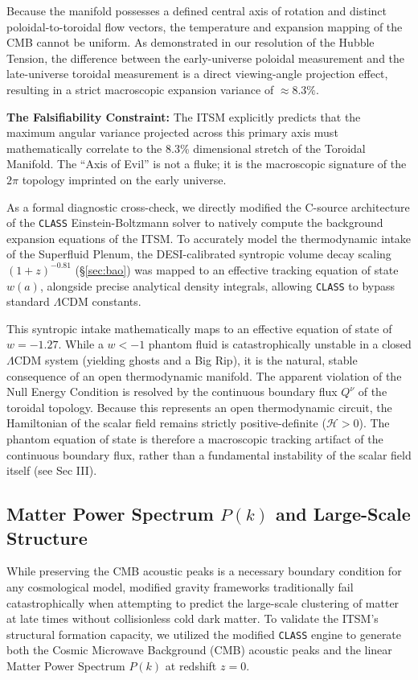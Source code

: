 \documentclass[aps,prd,10pt,twocolumn,superscriptaddress,nofootinbib,floatfix]{revtex4-2}
\begin{document}
Because the manifold possesses a defined central axis of rotation and distinct poloidal-to-toroidal flow vectors, the temperature and expansion mapping of the CMB cannot be uniform. As demonstrated in our resolution of the Hubble Tension, the difference between the early-universe poloidal measurement and the late-universe toroidal measurement is a direct viewing-angle projection effect, resulting in a strict macroscopic expansion variance of $\approx 8.3\%$.

\textbf{The Falsifiability Constraint:} The ITSM explicitly predicts that the maximum angular variance projected across this primary axis must mathematically correlate to the 8.3\% dimensional stretch of the Toroidal Manifold. The ``Axis of Evil'' is not a fluke; it is the macroscopic signature of the $2\pi$ topology imprinted on the early universe.

As a formal diagnostic cross-check, we directly modified the C-source architecture of the \texttt{CLASS} Einstein-Boltzmann solver \cite{class_code} to natively compute the background expansion equations of the ITSM. To accurately model the thermodynamic intake of the Superfluid Plenum, the DESI-calibrated syntropic volume decay scaling $(1+z)^{-0.81}$ (\S\ref{sec:bao}) was mapped to an effective tracking equation of state $w(a)$, alongside precise analytical density integrals, allowing \texttt{CLASS} to bypass standard $\Lambda$CDM constants.

This syntropic intake mathematically maps to an effective equation of state of $w = -1.27$. While a $w < -1$ phantom fluid is catastrophically unstable in a closed $\Lambda$CDM system (yielding ghosts and a Big Rip), it is the natural, stable consequence of an open thermodynamic manifold. The apparent violation of the Null Energy Condition is resolved by the continuous boundary flux $Q^\nu$ of the toroidal topology. Because this represents an open thermodynamic circuit, the Hamiltonian of the scalar field remains strictly positive-definite ($\mathcal{H} > 0$). The phantom equation of state is therefore a macroscopic tracking artifact of the continuous boundary flux, rather than a fundamental instability of the scalar field itself (see Sec III).

\subsection{\label{sec:camb_spectra}Matter Power Spectrum $P(k)$ and Large-Scale Structure}
While preserving the CMB acoustic peaks is a necessary boundary condition for any cosmological model, modified gravity frameworks traditionally fail catastrophically when attempting to predict the large-scale clustering of matter at late times without collisionless cold dark matter. To validate the ITSM's structural formation capacity, we utilized the modified \texttt{CLASS} engine to generate both the Cosmic Microwave Background (CMB) acoustic peaks and the linear Matter Power Spectrum $P(k)$ at redshift $z=0$.
\end{document}
